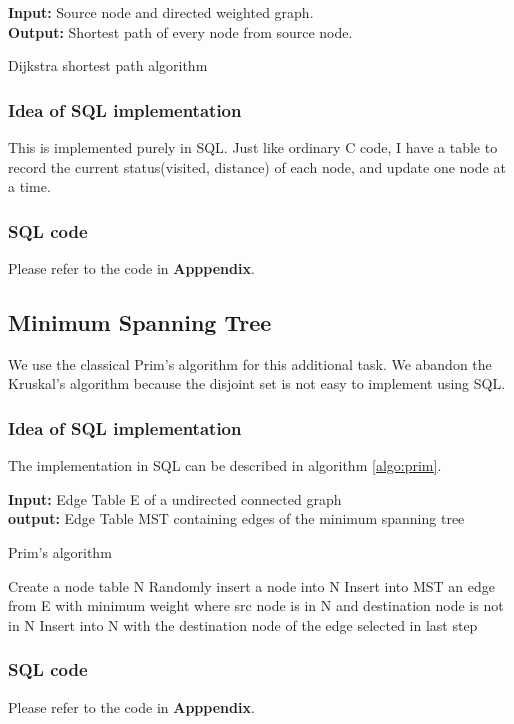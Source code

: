 \begin{algorithm}
{\bf Input:} Source node and directed weighted graph. \\
{\bf Output:} Shortest path of every node from source node. 
\begin{algorithmic}
\caption{Dijkstra shortest path algorithm}
\ENDFOR
{}
        \ENDIF
    \ENDFOR
\ENDWHILE
\end{algorithmic}
\label{algo:dijkstra}
\end{algorithm}

\subsubsection{Idea of SQL implementation}
This is implemented purely in SQL. Just like ordinary C code, I have a table to record the current status(visited, distance) of each node, and update one node at a time. 

\subsubsection{SQL code}
Please refer to the code in {\bf Apppendix}.

\subsection{Minimum Spanning Tree}
We use the classical Prim's algorithm for this additional task. We abandon the Kruskal's algorithm because the disjoint set is not easy to implement using SQL.

\subsubsection{Idea of SQL implementation}
The implementation in SQL can be described in algorithm \ref{algo:prim}.
 
\begin{algorithm}
{\bf Input:} Edge Table E of a undirected connected graph \\
{\bf output:} Edge Table MST containing edges of the minimum spanning tree
\begin{algorithmic}
\caption{Prim's algorithm}
\STATE Create a node table N
\STATE Randomly insert a node into N
	\STATE Insert into MST an edge from E with minimum weight where src node is in N and destination node is not in N
	\STATE Insert into N with the destination node of the edge selected in last step
\ENDFOR
\end{algorithmic}
\label{algo:prim}
\end{algorithm}

\subsubsection{SQL code}
Please refer to the code in {\bf Apppendix}.



